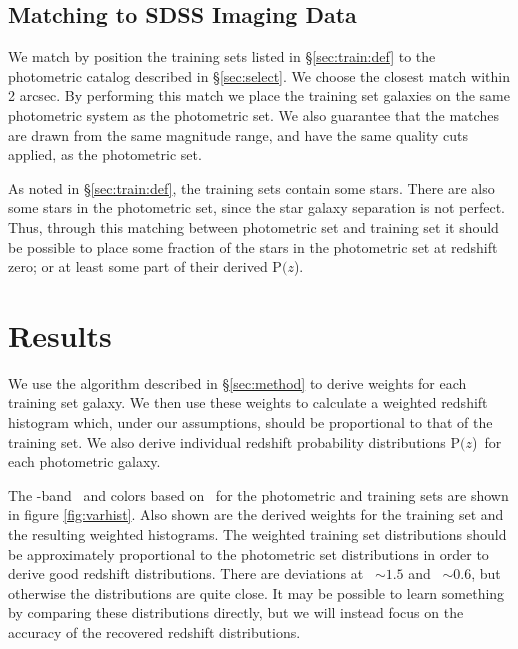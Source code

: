 \documentclass[preprint]{aastex}
\newcommand{\pofz}{P$(z$)}
\newcommand{\matchrad}{2 arcsec}
\begin{document}
\subsection{Matching to SDSS Imaging Data} \label{sec:train:match}

We match by position the training sets listed in \S \ref{sec:train:def} to the
photometric catalog described in \S \ref{sec:select}.  We choose the closest
match within \matchrad.  By performing this match we place the training set
galaxies on the same photometric system as the photometric set.  We also
guarantee that the matches are drawn from the same magnitude range, and
have the same quality cuts applied, as the photometric set.

As noted in \S \ref{sec:train:def}, the training sets contain some stars.
There are also some stars in the photometric set, since the star galaxy
separation is not perfect.  Thus, through this matching between photometric set
and training set it should be possible to place some fraction of the stars in
the photometric set at redshift zero; or at least some part of their derived
\pofz.

\section{Results}

We use the algorithm described in \S \ref{sec:method} to derive weights for
each training set galaxy.  We then use these weights to calculate a weighted
redshift histogram which, under our assumptions, should be proportional to that
of the training set.  We also derive individual redshift probability
distributions \pofz\ for each photometric galaxy.

The \rmag-band \cmodelmag\ and colors based on \modelmag\ for the photometric
and training sets are shown in figure \ref{fig:varhist}.  Also shown are the
derived weights for the training set and the resulting weighted histograms.
The weighted training set distributions should be approximately proportional to
the photometric set distributions in order to derive good redshift
distributions.  There are deviations at \gmr\ $\sim 1.5$ and \rmi\ $\sim 0.6$,
but otherwise the distributions are quite close.  It may be possible to learn
something by comparing these distributions directly, but we will instead focus
on the accuracy of the recovered redshift distributions.
\end{document}
